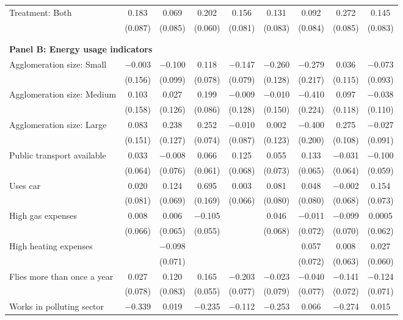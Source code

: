 \begin{tabular}{@{\extracolsep{5pt}}lcccccccc}
  Treatment: Both & 0.183 & 0.069 & 0.202 & 0.156 & 0.131 & 0.092 & 0.272 & 0.145 \\ 
  & (0.087) & (0.085) & (0.060) & (0.081) & (0.083) & (0.084) & (0.085) & (0.083) \\ 
 \\[1ex] \hline \\[1ex]
\multicolumn{ 9 }{l}{\textbf{ Panel B: Energy usage indicators }} \\
  Agglomeration size: Small & $-$0.003 & $-$0.100 & 0.118 & $-$0.147 & $-$0.260 & $-$0.279 & 0.036 & $-$0.073 \\ 
  & (0.156) & (0.099) & (0.078) & (0.079) & (0.128) & (0.217) & (0.115) & (0.093) \\ 
  Agglomeration size: Medium & 0.103 & 0.027 & 0.199 & $-$0.009 & $-$0.010 & $-$0.410 & 0.097 & $-$0.038 \\ 
  & (0.158) & (0.126) & (0.086) & (0.128) & (0.150) & (0.224) & (0.118) & (0.110) \\ 
  Agglomeration size: Large & 0.083 & 0.238 & 0.252 & $-$0.010 & 0.002 & $-$0.400 & 0.275 & $-$0.027 \\ 
  & (0.151) & (0.127) & (0.074) & (0.087) & (0.123) & (0.200) & (0.108) & (0.091) \\ 
  Public transport available & 0.033 & $-$0.008 & 0.066 & 0.125 & 0.055 & 0.133 & $-$0.031 & $-$0.100 \\ 
  & (0.064) & (0.076) & (0.061) & (0.068) & (0.073) & (0.065) & (0.064) & (0.059) \\ 
  Uses car & 0.020 & 0.124 & 0.695 & 0.003 & 0.081 & 0.048 & $-$0.002 & 0.154 \\ 
  & (0.081) & (0.069) & (0.169) & (0.066) & (0.080) & (0.080) & (0.068) & (0.073) \\ 
  High gas expenses & 0.008 & 0.006 & $-$0.105 &  & 0.046 & $-$0.011 & $-$0.099 & 0.0005 \\ 
  & (0.066) & (0.065) & (0.055) &  & (0.068) & (0.072) & (0.070) & (0.062) \\ 
  High heating expenses &  & $-$0.098 &  &  &  & 0.057 & 0.008 & 0.027 \\ 
  &  & (0.071) &  &  &  & (0.072) & (0.063) & (0.060) \\ 
  Flies more than once a year & 0.027 & 0.120 & 0.165 & $-$0.203 & $-$0.023 & $-$0.040 & $-$0.141 & $-$0.124 \\ 
  & (0.078) & (0.083) & (0.055) & (0.077) & (0.079) & (0.077) & (0.072) & (0.071) \\ 
  Works in polluting sector & $-$0.339 & 0.019 & $-$0.235 & $-$0.112 & $-$0.253 & 0.066 & $-$0.274 & 0.015 \\ 

\end{tabular}
